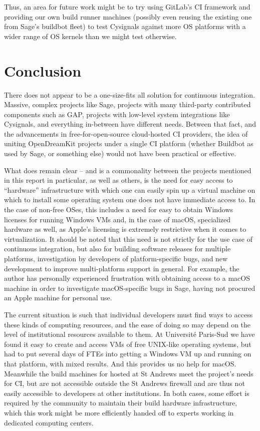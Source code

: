\documentclass{deliverablereport}
\begin{document}
Thus, an area for future work might be to try using GitLab's CI framework and
providing our own build runner machines (possibly even reusing the existing one
from Sage's buildbot fleet) to test Cysignals against more OS platforms with a
wider range of OS kernels than we might test otherwise.

\hypertarget{conclusion}{%
\section{Conclusion}\label{conclusion}}

There does not appear to be a one-size-fits all solution for continuous
integration.  Massive, complex projects like Sage, projects with many
third-party contributed components such as GAP, projects with low-level system
integrations like Cysignals, and everything in-between have different needs.
Between that fact, and the advancements in free-for-open-source cloud-hosted
CI providers, the idea of uniting OpenDreamKit projects under a single CI
platform (whether Buildbot as used by Sage, or something else) would not have
been practical or effective.

What does remain clear -- and is a commonality between the projects mentioned
in this report in particular, as well as others, is the need for easy access
to ``hardware'' infrastructure with which one can easily spin up a virtual
machine on which to install some operating system one does not have immediate
access to.  In the case of non-free OSes, this includes a need for easy to
obtain Windows licenses for running Windows VMs and, in the case of macOS,
specialized hardware as well, as Apple's licensing is extremely restrictive
when it comes to virtualization.  It should be noted that this need is not
strictly for the use case of continuous integration, but also for building
software releases for multiple platforms, investigation by developers of
platform-specific bugs, and new development to improve multi-platform support
in general.  For example, the author has personally experienced frustration
with obtaining access to a macOS machine in order to investigate macOS-specific
bugs in Sage, having not procured an Apple machine for personal use.

The current situation is such that individual developers must find ways to
access these kinds of computing resources, and the ease of doing so may depend
on the level of institutional resources available to them.  At Universit\'e
Paris-Sud we have found it easy to create and access VMs of free UNIX-like
operating systems, but had to put several days of FTEs into getting a Windows
VM up and running on that platform, with mixed results. And this provides us no
help for macOS.  Meanwhile the build machines for \GAP hosted at St Andrews
meet the project's needs for CI, but are not accessible outside the St Andrews
firewall and are thus not easily accessible to \GAP developers at other
institutions.  In both cases, some effort is required by the community to
maintain their build hardware infrastructure, which this work might be more
efficiently handed off to experts working in dedicated computing centers.
\end{document}
